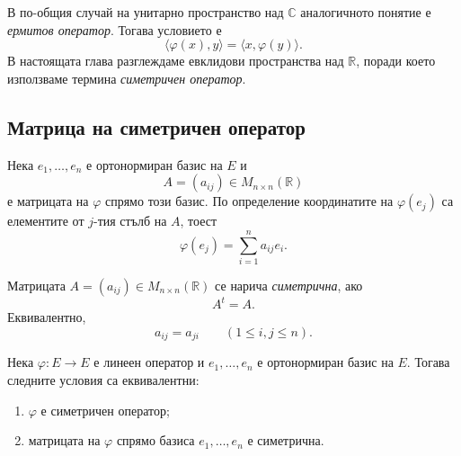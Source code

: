 \begin{remark}
В по-общия случай на унитарно пространство над $\mathbb{C}$ аналогичното понятие е \emph{ермитов оператор}. Тогава условието е
\[
\langle\varphi(x),y\rangle=\langle x,\varphi(y)\rangle.
\]
В настоящата глава разглеждаме евклидови пространства над $\mathbb{R}$, поради което използваме термина \emph{симетричен оператор}.
\end{remark}

\subsection{Матрица на симетричен оператор}\label{s:30.2.1}

Нека $e_1,\ldots,e_n$ е ортонормиран базис на $E$ и
\[
A=(a_{ij})\in M_{n\times n}(\mathbb{R})
\]
е матрицата на $\varphi$ спрямо този базис. По определение координатите на $\varphi(e_j)$ са елементите от $j$-тия стълб на $A$, тоест
\[
\varphi(e_j)=\sum_{i=1}^n a_{ij}e_i.
\]

\begin{defn}
Матрицата $A=(a_{ij})\in M_{n\times n}(\mathbb{R})$ се нарича \emph{симетрична}, ако
\[
A^t=A.
\]
Еквивалентно,
\[
a_{ij}=a_{ji}\qquad (1\leq i,j\leq n).
\]
\end{defn}

\begin{prop}
Нека $\varphi:E\to E$ е линеен оператор и $e_1,\ldots,e_n$ е ортонормиран базис на $E$. Тогава следните условия са еквивалентни:

\begin{enumerate}
\item $\varphi$ е симетричен оператор;
\item матрицата на $\varphi$ спрямо базиса $e_1,\ldots,e_n$ е симетрична.
\end{enumerate}
\end{prop}

